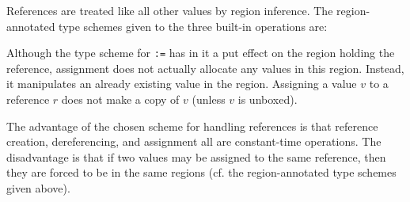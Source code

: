 \documentclass[12pt]{book}
\begin{document}
References are treated like all other values by region inference.
The region-annotated type schemes given to the three built-in operations
are:
\medskip

\medskip

\noindent
Although the type scheme for \verb+:=+ has in it a put effect
on the region holding the reference, assignment does not actually
allocate any values in this region. Instead, it manipulates an already
existing value in the region. Assigning a value $v$ to a reference $r$
does not make a copy of $v$ (unless $v$ is unboxed).

The advantage of the chosen scheme for handling references is that
reference creation, dereferencing, and assignment all are constant-time
operations. The disadvantage is that if two values may be
assigned to the same reference, then they are forced to be in the same regions (cf. the
region-annotated type schemes given above). 
\end{document}
